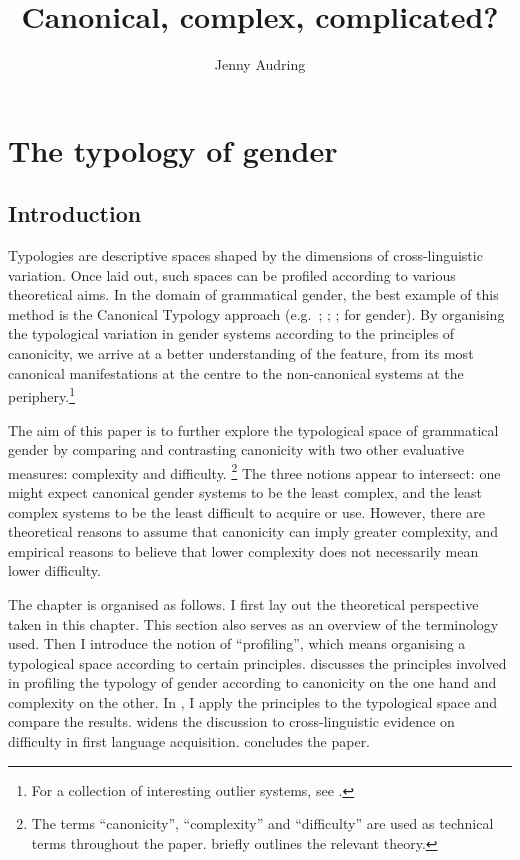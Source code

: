 \documentclass[output=collectionpaper]{langsci/langscibook}
\title{Canonical, complex, complicated?}
\author{%
Jenny Audring
\affiliation{Leiden University}
}%
\begin{document}
\maketitle

\section{The typology of gender}

\subsection{Introduction}

Typologies are descriptive spaces shaped by the dimensions of cross-linguistic variation. Once laid out, such spaces can be profiled according to various theoretical aims. In the domain of grammatical gender, the best example of this method is the Canonical Typology approach (e.g.\ \citealt{Corbett2006}; \citealt{Brown2013}; \citealt{Bond2019}; \citealt{Corbett2016} for gender). By organising the typological variation in gender systems according to the principles of canonicity, we arrive at a better understanding of the feature, from its most canonical manifestations at the centre to the non-canonical systems at the periphery.\footnote{For a collection of interesting outlier systems, see \citet{Fedden2018}.}

The aim of this paper is to further explore the typological space of grammatical gender by comparing and contrasting canonicity with two other evaluative measures: complexity and difficulty.%
\footnote{The terms ``canonicity'', ``complexity'' and ``difficulty'' are used as technical terms throughout the paper.  briefly outlines the relevant theory.} %
The three notions appear to intersect: one might expect canonical gender systems to be the least complex, and the least complex systems to be the least difficult to acquire or use. However, there are theoretical reasons to assume that canonicity can imply greater complexity, and empirical reasons to believe that lower complexity does not necessarily mean lower difficulty.

The chapter is organised as follows. I first lay out the theoretical perspective taken in this chapter. This section also serves as an overview of the terminology used. Then I introduce the notion of ``profiling'', which means organising a typological space according to certain principles.  discusses the principles involved in profiling the typology of gender according to canonicity on the one hand and complexity on the other. In , I apply the principles to the typological space and compare the results.  widens the discussion to cross-linguistic evidence on difficulty in first language acquisition.  concludes the paper.
\end{document}
